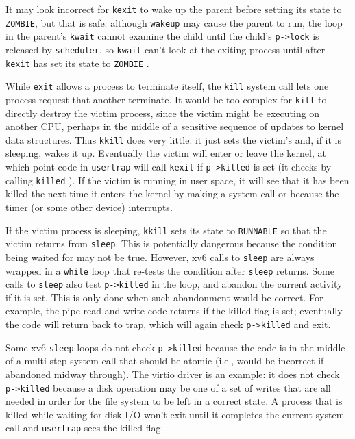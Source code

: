It may look incorrect for \lstinline{kexit} to wake up the parent
before setting its state to \lstinline{ZOMBIE}, 
but that is safe:
although
\lstinline{wakeup}
may cause the parent to run,
the loop in the parent's
\lstinline{kwait}
cannot examine the child until the child's
\lstinline{p->lock}
is released by {\tt scheduler},
so
\lstinline{kwait}
can't look at
the exiting process until after
\lstinline{kexit}
has set its state to
\lstinline{ZOMBIE}
.

While
\lstinline{exit} 
allows a process to terminate itself,
the \lstinline{kill} system call
lets one process request that another terminate.
It would be too complex for
\lstinline{kill}
to directly destroy the victim process, since the victim
might be executing on another CPU, perhaps
in the middle of a sensitive sequence of updates to kernel data structures.
Thus
\lstinline{kkill}
does very little: it just sets the victim's
and, if it is sleeping, wakes it up.
Eventually the victim will enter or leave the kernel,
at which point code in
\lstinline{usertrap}
will call
\lstinline{kexit}
if
\lstinline{p->killed}
is set
(it checks by calling
\lstinline{killed}
).
If the victim is running in user space, it will 
see that it has been killed the next time it enters
the kernel by making a system call or because the timer (or
some other device) interrupts.

If the victim process is sleeping,
\lstinline{kkill}
sets its state to \lstinline{RUNNABLE}
so that the victim returns from
\lstinline{sleep}.
This is potentially dangerous because 
the condition being waited for may not be true.
However, xv6 calls to
\lstinline{sleep}
are always wrapped in a
\lstinline{while}
loop that re-tests the condition after
\lstinline{sleep}
returns.
Some calls to
\lstinline{sleep}
also test
\lstinline{p->killed}
in the loop, and abandon the current activity if it is set.
This is only done when such abandonment would be correct.
For example, the pipe read and write code
returns if the killed flag is set; eventually the
code will return back to trap, which will again
check \lstinline{p->killed} and exit.

Some xv6 
\lstinline{sleep}
loops do not check
\lstinline{p->killed} 
because the code is in the middle of a multi-step
system call that should be atomic (i.e., would be
incorrect if abandoned midway through).
The virtio driver
is an example: it does not check
\lstinline{p->killed}
because a disk operation may be one of a set of
writes that are all needed in order for the file system to
be left in a correct state.
A process that is killed while waiting for disk I/O won't
exit until it completes the current system call and
\lstinline{usertrap} sees the killed flag.

